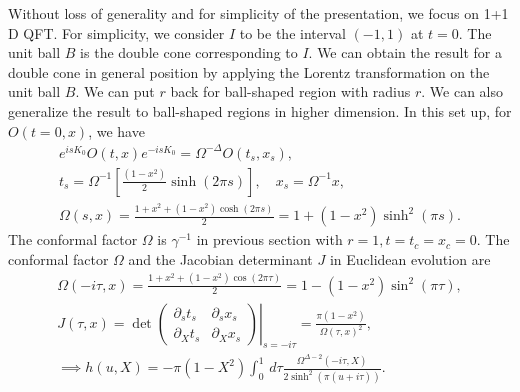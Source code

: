 \documentclass[a4paper,11pt]{article}
\theoremstyle{definition}
\theoremstyle{remark}
\begin{document}
Without loss of generality and for simplicity of the presentation, we focus on 1+1 D QFT. For simplicity, we consider $I$ to be the interval $(-1,1)$ at $t = 0$. The unit ball $B$ is the double cone corresponding to $I$. We can obtain the result for a double cone in general position by applying the Lorentz transformation on the unit ball $B$. We can put $r$ back for ball-shaped region with radius $r$. We can also generalize the result to ball-shaped regions in higher dimension. %
In this set up, for $O(t=0,x)$, we have
\begin{gather}
    e^{isK_0} O(t,x) e^{-isK_0} = \Omega^{-\Delta} O(t_s,x_s), \\
    t_s = {\Omega}^{-1}\left[\frac{(1-x^2)}{2}\sinh(2\pi s) \right], \quad x_s = {\Omega}^{-1}x, \\
    {\Omega}(s,x) =  \frac{1+x^2+(1-x^2)\cosh(2\pi s)}{2} = 1+(1-x^2)\sinh^2(\pi s).
\end{gather}
The conformal factor $\Omega$ is $\gamma^{-1}$ in previous section with $r = 1, t =t_c=x_c=0$. The conformal factor $\Omega$ and the Jacobian determinant $J$ in Euclidean evolution are
\begin{gather}
    \Omega(-i\tau,x)= \frac{1+x^2+(1-x^2)\cos(2\pi \tau)}{2} =1-(1-x^2)\sin^2(\pi \tau),\\
    J(\tau,x) = \det \left.\begin{pmatrix}
        \partial_st_{s} & \partial_s x_{s}\\  \partial_X t_{s}& \partial_X x_{s}
    \end{pmatrix}\right|_{s=-i\tau} =\frac{\pi (1-x^2)}{\Omega(\tau,x)^2},\\
    \implies h(u,X) = -\pi(1-X^2)\int_0^1\, d\tau \frac{\Omega^{\Delta-2}(-i\tau,X)}{2\sinh^2(\pi (u+i\tau))}.
\end{gather}
\end{document}
